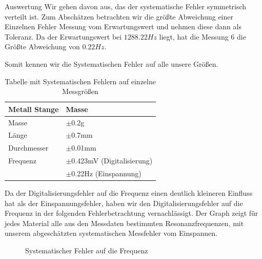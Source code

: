 \documentclass[twoside]{protokoll}
\begin{document}
\begin{aufgabe}{Auswertung}
Wir gehen davon aus, das der systematische Fehler symmetrisch verteilt ist.
Zum Abschätzen betrachten wir die größte Abweichung einer Einzelnen Fehler Messung vom Erwartungswert und nehmen diese dann als Toleranz.
Da der Erwartungswert bei $1288.22 Hz$ liegt, hat die Messung 6 die Größte Abweichung von $0.22 Hz$.

Somit kennen wir die Systematischen Fehler auf alle unsere Größen.\\
 

\begin{table}[H]
    \centering
    \begin{tabularx}{0.8\textwidth}{X l} %
        \toprule
        \textbf{Metall Stange} & \textbf{Masse} \\
        \midrule
        Masse & $\pm$0.2g \\
        Länge & $\pm$0.7mm\\
        Durchmesser & $\pm$0.01mm \\
        Frequenz & $\pm$0.423mV (Digitalisierung)\\
        & $\pm$0.22Hz (Einspannung) \\
        \bottomrule
    \end{tabularx}
    \caption{Tabelle mit Systematischen Fehlern auf einzelne Messgrößen}
    \label{tab:mytable}
\end{table}

Da der Digitalisierungsfehler auf die Frequenz einen deutlich kleineren Einfluss hat als der Einspannungsfehler, haben wir den Digitalisierungsfehler auf die Frequenz in der folgenden Fehlerbetrachtung vernachlässigt.
Der Graph zeigt für jedes Material alle aus den Messdaten bestimmten Resonanzfrequenzen, mit unserem abgeschätzten systematischen Messfehler vom Einspannen.

\begin{figure}[H]
  \centering
    \caption{Systematischer Fehler auf die Frequenz}
  \hfill
\end{figure}
\begin{figure}[H]
  \centering
  \hfill
\end{figure}


\end{aufgabe}
\end{document}
